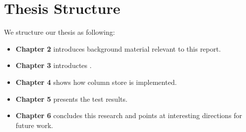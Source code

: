 \section{Thesis Structure}
\label{sec:Thesis Structure}
We structure our thesis as following:
\begin{itemize}
  \item \textbf{Chapter 2} introduces background material relevant to this report. 
  \item \textbf{Chapter 3} introductes \genusSoftware.
  \item \textbf{Chapter 4} shows how column store is implemented.
  \item \textbf{Chapter 5} presents the test results.
  \item \textbf{Chapter 6} concludes this research and points at interesting directions for future work.
\end{itemize}



